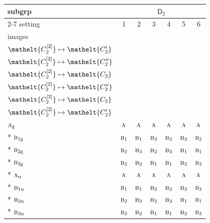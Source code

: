 \documentclass[10pt,a4paper]{article}
\numberwithin{equation}{section}
\newcommand{\eltfont}[1]{{\let\sigma\eltsigma\mathelt{#1}}}
\newcommand{\grp}[1]{\mathsf{#1}}
\newcommand{\irr}[1]{\text{\normalfont\scshape #1}}
\newcommand{\cls}[1]{\eltfont{#1}}
\newcommand{\ptag}[1]{\mathrm{#1}}
\newcommand{\genidx}[2]{#1^{[\mathrm{#2}]}}
\begin{document}
{\small\begin{longtable}{@{}lcccccc@{}}\toprule
subgrp & \multicolumn{6}{c}{\href{D2.pdf}{$\grp{D_{2}}$}}\\\cmidrule(lr){2-7}
setting & 1 & 2 & 3 & 4 & 5 & 6\\
images & {\scriptsize\begin{tabular}[t]{@{}c@{}}$\cls{\genidx{C_{2}}{1}} \mapsto \cls{C_{2}}$\\$\cls{\genidx{C_{2}}{2}} \mapsto \cls{C_{2}'}$\end{tabular}} & {\scriptsize\begin{tabular}[t]{@{}c@{}}$\cls{\genidx{C_{2}}{1}} \mapsto \cls{C_{2}}$\\$\cls{\genidx{C_{2}}{2}} \mapsto \cls{C_{2}''}$\end{tabular}} & {\scriptsize\begin{tabular}[t]{@{}c@{}}$\cls{\genidx{C_{2}}{1}} \mapsto \cls{C_{2}'}$\\$\cls{\genidx{C_{2}}{2}} \mapsto \cls{C_{2}}$\end{tabular}} & {\scriptsize\begin{tabular}[t]{@{}c@{}}$\cls{\genidx{C_{2}}{1}} \mapsto \cls{C_{2}'}$\\$\cls{\genidx{C_{2}}{2}} \mapsto \cls{C_{2}''}$\end{tabular}} & {\scriptsize\begin{tabular}[t]{@{}c@{}}$\cls{\genidx{C_{2}}{1}} \mapsto \cls{C_{2}''}$\\$\cls{\genidx{C_{2}}{2}} \mapsto \cls{C_{2}}$\end{tabular}} & {\scriptsize\begin{tabular}[t]{@{}c@{}}$\cls{\genidx{C_{2}}{1}} \mapsto \cls{C_{2}''}$\\$\cls{\genidx{C_{2}}{2}} \mapsto \cls{C_{2}'}$\end{tabular}}\\\midrule\endhead
\bottomrule\endfoot\endlastfoot
$\irr{a}_{\ptag{g}}$ & $\irr{a}$ & $\irr{a}$ & $\irr{a}$ & $\irr{a}$ & $\irr{a}$ & $\irr{a}$\\*
$\irr{b}_{1\ptag{g}}$ & $\irr{b}_{1}$ & $\irr{b}_{1}$ & $\irr{b}_{3}$ & $\irr{b}_{2}$ & $\irr{b}_{3}$ & $\irr{b}_{2}$\\*
$\irr{b}_{2\ptag{g}}$ & $\irr{b}_{2}$ & $\irr{b}_{3}$ & $\irr{b}_{2}$ & $\irr{b}_{3}$ & $\irr{b}_{1}$ & $\irr{b}_{1}$\\*
$\irr{b}_{3\ptag{g}}$ & $\irr{b}_{3}$ & $\irr{b}_{2}$ & $\irr{b}_{1}$ & $\irr{b}_{1}$ & $\irr{b}_{2}$ & $\irr{b}_{3}$\\*
$\irr{a}_{\ptag{u}}$ & $\irr{a}$ & $\irr{a}$ & $\irr{a}$ & $\irr{a}$ & $\irr{a}$ & $\irr{a}$\\*
$\irr{b}_{1\ptag{u}}$ & $\irr{b}_{1}$ & $\irr{b}_{1}$ & $\irr{b}_{3}$ & $\irr{b}_{2}$ & $\irr{b}_{3}$ & $\irr{b}_{2}$\\*
$\irr{b}_{2\ptag{u}}$ & $\irr{b}_{2}$ & $\irr{b}_{3}$ & $\irr{b}_{2}$ & $\irr{b}_{3}$ & $\irr{b}_{1}$ & $\irr{b}_{1}$\\*
$\irr{b}_{3\ptag{u}}$ & $\irr{b}_{3}$ & $\irr{b}_{2}$ & $\irr{b}_{1}$ & $\irr{b}_{1}$ & $\irr{b}_{2}$ & $\irr{b}_{3}$\\
\bottomrule\end{longtable}}
\end{document}
